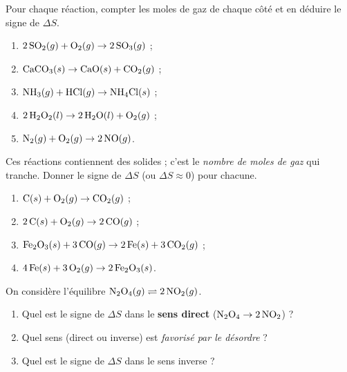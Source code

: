 \documentclass[11pt,a4paper]{article}
\newcommand{\dS}{\Delta S}
\begin{document}
\begin{center}
\end{center}

\begin{exercice}
Pour chaque réaction, compter les moles de gaz de chaque côté et en déduire le signe de $\dS$.
\begin{enumerate}[label=\alph*),leftmargin=2em,topsep=2pt,itemsep=2pt]
  \item $2\,\ce{SO2}(g) + \ce{O2}(g) \rightarrow 2\,\ce{SO3}(g)$ ;
  \item $\ce{CaCO3}(s) \rightarrow \ce{CaO}(s) + \ce{CO2}(g)$ ;
  \item $\ce{NH3}(g) + \ce{HCl}(g) \rightarrow \ce{NH4Cl}(s)$ ;
  \item $2\,\ce{H2O2}(l) \rightarrow 2\,\ce{H2O}(l) + \ce{O2}(g)$ ;
  \item $\ce{N2}(g) + \ce{O2}(g) \rightarrow 2\,\ce{NO}(g)$.
\end{enumerate}
\end{exercice}

\begin{exercice}
Ces réactions contiennent des solides ; c'est le \emph{nombre de moles de gaz} qui tranche. Donner le
signe de $\dS$ (ou $\dS\approx0$) pour chacune.
\begin{enumerate}[label=\alph*),leftmargin=2em,topsep=2pt,itemsep=2pt]
  \item $\ce{C}(s) + \ce{O2}(g) \rightarrow \ce{CO2}(g)$ ;
  \item $2\,\ce{C}(s) + \ce{O2}(g) \rightarrow 2\,\ce{CO}(g)$ ;
  \item $\ce{Fe2O3}(s) + 3\,\ce{CO}(g) \rightarrow 2\,\ce{Fe}(s) + 3\,\ce{CO2}(g)$ ;
  \item $4\,\ce{Fe}(s) + 3\,\ce{O2}(g) \rightarrow 2\,\ce{Fe2O3}(s)$.
\end{enumerate}
\end{exercice}

\begin{exercice}
On considère l'équilibre \;$\ce{N2O4}(g) \rightleftharpoons 2\,\ce{NO2}(g)$.
\begin{enumerate}[label=\alph*),leftmargin=2em,topsep=2pt,itemsep=2pt]
  \item Quel est le signe de $\dS$ dans le \textbf{sens direct} ($\ce{N2O4} \rightarrow 2\,\ce{NO2}$) ?
  \item Quel sens (direct ou inverse) est \emph{favorisé par le désordre} ?
  \item Quel est le signe de $\dS$ dans le sens inverse ?
\end{enumerate}
\end{exercice}
\end{document}
